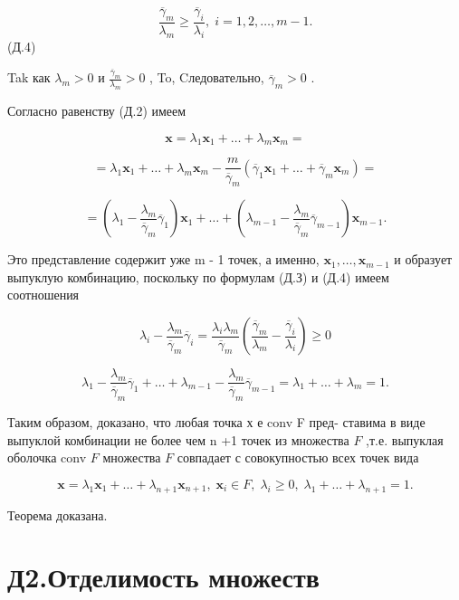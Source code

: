 \documentclass[8pt]{extarticle}
\begin{document}
\[
\frac{{\overline{\gamma }}_{m}}{{\lambda }_{m}} \geq  \frac{{\overline{\gamma }}_{i}}{{\lambda }_{i}},\;i = 1,2,\ldots ,m - 1.
\]
 (Д.4)

Tak как \({\lambda }_{m} > 0\) и \(\frac{{\overline{\gamma }}_{m}}{{\lambda }_{m}} > 0\) , To, Cледовательно, \({\overline{\gamma }}_{m} > 0\) .

Согласно равенству (Д.2) имеем

\[
\mathbf{x} = {\lambda }_{1}{\mathbf{x}}_{1} + \ldots  + {\lambda }_{m}{\mathbf{x}}_{m} =
\]

\[
= {\lambda }_{1}{\mathbf{x}}_{1} + \ldots  + {\lambda }_{m}{\mathbf{x}}_{m} - \frac{m}{{\overline{\gamma }}_{m}}\left( {{\overline{\gamma }}_{1}{\mathbf{x}}_{1} + \ldots  + {\overline{\gamma }}_{m}{\mathbf{x}}_{m}}\right)  =
\]

\[
= \left( {{\lambda }_{1} - \frac{{\lambda }_{m}}{{\overline{\gamma }}_{m}}{\overline{\gamma }}_{1}}\right) {\mathbf{x}}_{1} + \ldots  + \left( {{\lambda }_{m - 1} - \frac{{\lambda }_{m}}{{\overline{\gamma }}_{m}}{\overline{\gamma }}_{m - 1}}\right) {\mathbf{x}}_{m - 1}.
\]

Это представление содержит уже m - 1 точек, а именно, \({\mathbf{x}}_{1},\ldots ,{\mathbf{x}}_{m - 1}\) и образует выпуклую комбинацию, поскольку по формулам (Д.З) и (Д.4) имеем соотношения

\[
{\lambda }_{i} - \frac{{\lambda }_{m}}{{\overline{\gamma }}_{m}}{\overline{\gamma }}_{i} = \frac{{\lambda }_{i}{\lambda }_{m}}{{\overline{\gamma }}_{m}}\left( {\frac{{\overline{\gamma }}_{m}}{{\lambda }_{m}} - \frac{{\overline{\gamma }}_{i}}{{\lambda }_{i}}}\right)  \geq  0
\]

\[
{\lambda }_{1} - \frac{{\lambda }_{m}}{{\overline{\gamma }}_{m}}{\overline{\gamma }}_{1} + \ldots  + {\lambda }_{m - 1} - \frac{{\lambda }_{m}}{{\overline{\gamma }}_{m}}{\overline{\gamma }}_{m - 1} = {\lambda }_{1} + \ldots  + {\lambda }_{m} = 1.
\]

Таким образом, доказано, что любая точка х е conv F пред- ставима в виде выпуклой комбинации не более чем n +1 точек из множества \(F\) ,т.е. выпуклая оболочка conv \(F\) множества \(F\) совпадает с совокупностью всех точек вида

\[
\mathbf{x} = {\lambda }_{1}{\mathbf{x}}_{1} + \ldots  + {\lambda }_{n + 1}{\mathbf{x}}_{n + 1},\;{\mathbf{x}}_{i} \in  F,\;{\lambda }_{i} \geq  0,\;{\lambda }_{1} + \ldots  + {\lambda }_{n + 1} = 1.
\]

Теорема доказана.

\section*{Д2.Отделимость множеств}
\end{document}

